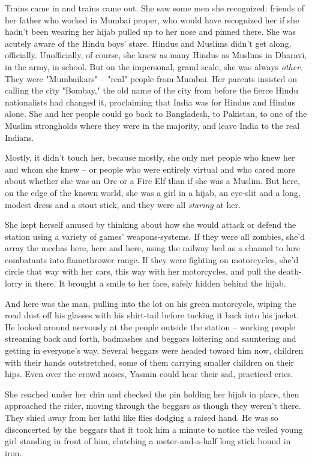 Trains came in and trains came out. She saw some men she
recognized: friends of her father who worked in Mumbai proper, who
would have recognized her if she hadn't been wearing her hijab
pulled up to her nose and pinned there. She was acutely aware of
the Hindu boys' stare. Hindus and Muslims didn't get along,
officially. Unofficially, of course, she knew as many Hindus as
Muslims in Dharavi, in the army, in school. But on the impersonal,
grand scale, she was always \emph{other}. They were "Mumbaikars" --
"real" people from Mumbai. Her parents insisted on calling the city
"Bombay," the old name of the city from before the fierce Hindu
nationalists had changed it, proclaiming that India was for Hindus
and Hindus alone. She and her people could go back to Bangladesh,
to Pakistan, to one of the Muslim strongholds where they were in
the majority, and leave India to the real Indians.

Mostly, it didn't touch her, because mostly, she only met people
who knew her and whom she knew -- or people who were entirely
virtual and who cared more about whether she was an Orc or a Fire
Elf than if she was a Muslim. But here, on the edge of the known
world, she was a girl in a hijab, an eye-slit and a long, modest
dress and a stout stick, and they were all \emph{staring} at her.

She kept herself amused by thinking about how she would attack or
defend the station using a variety of games' weapons-systems. If
they were all zombies, she'd array the mechas here, here and here,
using the railway bed as a channel to lure combatants into
flamethrower range. If they were fighting on motorcycles, she'd
circle that way with her cars, this way with her motorcycles, and
pull the death-lorry in there. It brought a smile to her face,
safely hidden behind the hijab.

And here was the man, pulling into the lot on his green motorcycle,
wiping the road dust off his glasses with his shirt-tail before
tucking it back into his jacket. He looked around nervously at the
people outside the station -- working people streaming back and
forth, badmashes and beggars loitering and sauntering and getting
in everyone's way. Several beggars were headed toward him now,
children with their hands outstretched, some of them carrying
smaller children on their hips. Even over the crowd noises, Yasmin
could hear their sad, practiced cries.

She reached under her chin and checked the pin holding her hijab in
place, then approached the rider, moving through the beggars as
though they weren't there. They shied away from her lathi like
flies dodging a raised hand. He was so disconcerted by the beggars
that it took him a minute to notice the veiled young girl standing
in front of him, clutching a meter-and-a-half long stick bound in
iron.

